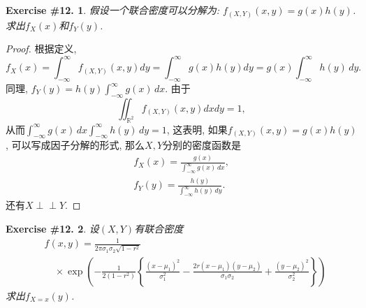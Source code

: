 \documentclass[UTF8, a4paper]{article}
\newcommand{\Perp}{\perp\!\!\!\!\perp}
\newtheorem{exercise}{Exercise \#12.}
\begin{document}
\begin{framed}
\begin{exercise}
假设一个联合密度可以分解为: \(f_{(X,Y)}(x, y) = g(x) h(y)\). 求出\(f_X(x)\)和\(f_Y(y)\).
\end{exercise}
\end{framed}

\begin{proof}
根据定义, 
$$
f_X(x) = \int_{-\infty}^{\infty} f_{(X,Y)}(x,y) dy = \int_{-\infty}^{\infty} g(x) h(y) dy = g(x) \int_{-\infty}^{\infty} h(y) \,dy.
$$
同理, \(f_Y(y) = h(y) \int_{-\infty}^{\infty} g(x)\, dx\).
由于
$$
\iint_{\mathbb{R}^2} f_{(X,Y)}(x,y) dxdy = 1,
$$
从而\(\int_{-\infty}^{\infty} g(x)\, dx \int_{-\infty}^{\infty} h(y) \,dy = 1\), 
这表明, 如果\(f_{(X,Y)}(x,y) = g(x) h(y)\), 可以写成因子分解的形式, 
那么\(X, Y\)分别的密度函数是
$$
\begin{gathered}
f_X(x) = \frac{g(x)}{\int_{-\infty}^{\infty} g(x)\, dx} , \\
f_Y(y) = \frac{h(y)}{\int_{-\infty}^{\infty} h(y)\, dy}.
\end{gathered}
$$
还有\(X \Perp Y\).
\end{proof}


\begin{framed}
\begin{exercise}
设\((X,Y)\)有联合密度
$$
\begin{aligned}
& f(x, y)=\frac{1}{2 \pi \sigma_1 \sigma_2 \sqrt{1-r^2}} \\
& \quad \times \exp \left(-\frac{1}{2\left(1-r^2\right)}\left\{\frac{\left(x-\mu_1\right)^2}{\sigma_1^2}-\frac{2 r\left(x-\mu_1\right)\left(y-\mu_2\right)}{\sigma_1 \sigma_2}+\frac{\left(y-\mu_2\right)^2}{\sigma_2^2}\right\}\right)
\end{aligned}
$$
求出\(f_{X=x}(y)\).
\end{exercise}
\end{framed}
\end{document}
